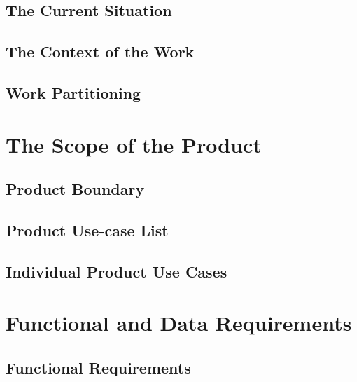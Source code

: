 \documentclass{scrreprt}
\begin{document}
\subsection{The Current Situation}

\subsection{The Context of the Work}

\subsection{Work Partitioning}

\section{The Scope of the Product}

\subsection{Product Boundary}

\subsection{Product Use-case List}

\subsection{Individual Product Use Cases}

\section{Functional and Data Requirements}

\subsection{Functional Requirements}
\end{document}
